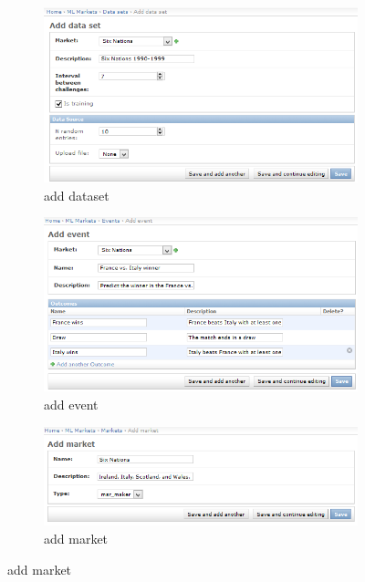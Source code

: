 \documentclass[bsc,frontabs,twoside,singlespacing,parskip,deptreport]{infthesis}     %
\begin{document}
\begin{figure}
\caption{market actions}

\begin{subfigure}{.8\textwidth}
  \includegraphics[width=1\linewidth]{figures/admin-dataset-add(c).png}
  \caption{add dataset}
   \label{fig:add-dataset}
\end{subfigure}%

\begin{subfigure}{.8\textwidth}

  \includegraphics[width=1\linewidth]{figures/admin-event-add(c).png}
  \caption{add event}
  \label{fig:add-event}
\end{subfigure}

\begin{subfigure}{.8\textwidth}

  \includegraphics[width=1\linewidth]{figures/admin-market-add(1).png}
  \caption{add market}
  \label{fig:add-market}
\end{subfigure}
\label{fig:market-actions}


\end{figure}
\end{document}
